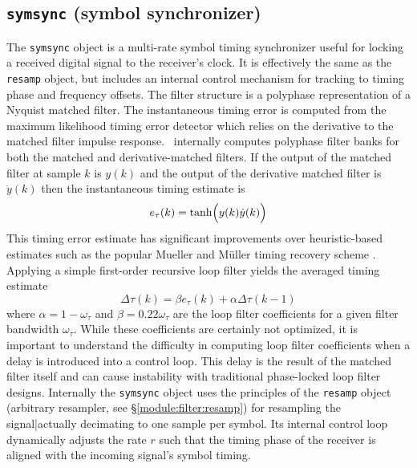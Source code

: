 \subsection{{\tt symsync} (symbol synchronizer)}
\label{module:filter:symsync}
The {\tt symsync} object is a multi-rate symbol timing synchronizer
useful for locking a received digital signal to the receiver's clock.
It is effectively the same as the {\tt resamp} object, but includes an
internal control mechanism for tracking to timing phase and frequency
offsets.
The filter structure is a polyphase representation of a Nyquist matched
filter.
%
The instantaneous timing error is computed from the maximum likelihood
timing error detector \cite{Mengali:1997} which relies on the derivative
to the matched filter impulse response.
\liquid\ internally computes polyphase filter banks for both the
matched and derivative-matched filters.
If the output of the matched filter at sample $k$ is $y(k)$
and the output of the derivative matched filter is $\dot{y}(k)$
then the instantaneous timing estimate is
%
\begin{equation}
\label{eqn:filter:symsync:timing_error}
    e_\tau(k) = \tanh\Bigl( y(k)\dot{y}(k) \Bigr)
\end{equation}
%
This timing error estimate has significant improvements over
heuristic-based estimates such as the popular Mueller and M\"{u}ller
timing recovery scheme \cite{Mueller:1976}. %
Applying a simple first-order recursive loop filter yields the averaged
timing estimate
%
\begin{equation}
\label{eqn:filter:symsync:timing_error_filtered}
    \Delta\tau(k) = \beta e_\tau(k) + \alpha\Delta\tau(k-1)
\end{equation}
%
where
$\alpha = 1-\omega_\tau$ and $\beta = 0.22\omega_\tau$
are the loop filter coefficients for a given filter bandwidth
$\omega_\tau$.
While these coefficients are certainly not optimized,
it is important to understand the difficulty in computing loop filter
coefficients when a delay is introduced into a control loop.
This delay is the result of the matched filter itself and can cause
instability with traditional phase-locked loop filter designs.
%
Internally the {\tt symsync} object uses the principles of the
{\tt resamp} object
(arbitrary resampler, see \S\ref{module:filter:resamp})
for resampling the signal|actually decimating to one sample per symbol.
Its internal control loop dynamically adjusts the rate $r$ such that
the timing phase of the receiver is aligned with the incoming signal's
symbol timing.

